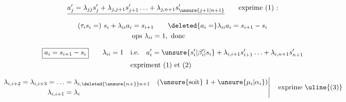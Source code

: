 
\[
\underline{a'_j=\lambda_{jj}s'_j+\lambda_{j,j+1}s'_{j+1}\ldots+\lambda_{j,n+1}s'_{\unsure{j+1|n+1}}}\qquad\text{exprime (1) :}
\]

\[
\begin{aligned}
(\tau_i s_i=)\ s_i+\lambda_{ii}a_i&=s_{i+1}\qquad\deleted{a_i=}\lambda_{ii}a_i=s_{i+1}-s_i\\
&\text{ops }\lambda_{ii}=1,\ \text{donc}
\end{aligned}
\]

\[
\begin{aligned}
\boxed{a_i=s_{i+1}-s_i}\qquad\lambda_{ii}=1\quad &\text{i.e.}\quad a'_i=\unsure{s'_i|\beta'_i|s_i}+\lambda_{i,i+1}s'_{i+1}\ldots+\lambda_{i,n+1}s'_{n+1}\\
&\text{expriment (1) et (2)}
\end{aligned}
\]

\[
\left.\begin{aligned}
\lambda_{i,i+2}=\lambda_{i,i+3}=\ldots&=\lambda_{i,\deleted{\unsure{n+}}n+1}
 \quad(\unsure{\text{soit}}\ 1+\unsure{\mu_i|\alpha_i})\\
\lambda_{i,i+1}&=\lambda_i
\end{aligned}\right|\quad\text{exprime \uline{(3)}}
\]

